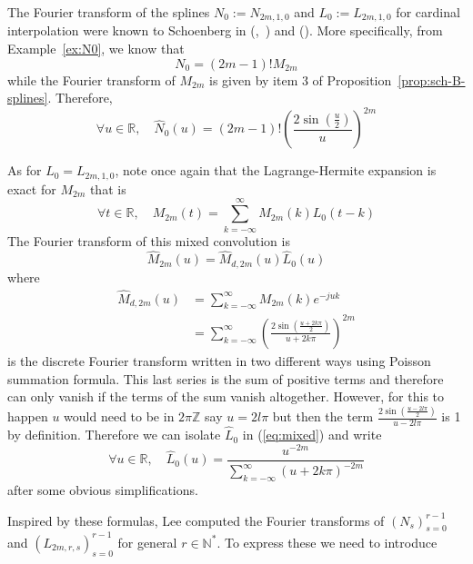 \begin{example} The Fourier transform of the splines $N_0 := N_{2m, 1, 0}$ and $L_0 := L_{2m,1,0}$ for cardinal 
  interpolation were known to Schoenberg in (\cite[Lecture 2, (1.8)]{Sch73},~\cite[(1.3)]{SS73}) and (\cite[Lecture 10, 
  (1.11)]{Sch73}). More specifically, from Example~\ref{ex:N0}, we know that \begin{equation*}
    N_0 = (2m-1)!M_{2m}
  \end{equation*}
  while the Fourier transform of $M_{2m}$ is given by item 3 of Proposition~\ref{prop:sch-B-splines}. Therefore, 
  \begin{equation}
    \forall u \in \mathbb{R}, \quad \hat{N}_0(u) = (2m-1)! {\left(\frac{2\sin(\frac{u}{2})}{u}\right)}^{2m}
  \end{equation}

  As for $L_0 = L_{2m,1,0}$, note once again that the Lagrange-Hermite expansion is exact for $M_{2m}$ that is 
  \begin{equation*}
    \forall t \in \mathbb{R}, \quad M_{2m}(t) = \sum_{k=-\infty}^{\infty} M_{2m}(k) L_0(t-k)
  \end{equation*}
  The Fourier transform of this mixed convolution is \begin{equation}\label{eq:mixed}
    \hat{M}_{2m}(u) = \hat{M}_{d,2m}(u) \hat{L}_0(u)
  \end{equation}
  where \begin{align*} \hat{M}_{d, 2m}(u) &= \sum_{k=-\infty}^{\infty} M_{2m}(k) e^{-juk} \\
    &= \sum_{k=-\infty}^{\infty} {\left(\frac{2 \sin(\frac{u+2k\pi}{2})}{u+2k\pi}\right)}^{2m}
  \end{align*}
  is the discrete Fourier transform written in two different ways using Poisson summation formula. This last series is 
  the sum of positive terms and therefore can only vanish if the terms of the sum vanish altogether. However, for this 
  to happen $u$ would need to be in $2\pi\mathbb{Z}$ say $u = 2l\pi$ but then the term $\frac{2 
  \sin(\frac{u-2l\pi}{2})}{u-2l\pi}$ is 1 by definition. Therefore we can isolate $\hat{L}_0$ in (\ref{eq:mixed}) and 
  write
  \begin{equation}
    \forall u \in \mathbb{R}, \quad \hat{L}_0(u) = \frac{u^{-2m}}{\displaystyle\sum_{k=-\infty}^{\infty} 
    {(u+2k\pi)}^{-2m}}
  \end{equation}
  after some obvious simplifications.
\end{example}

Inspired by these formulas, Lee computed the Fourier transforms of ${(N_s)}_{s=0}^{r-1}$ and 
${(L_{2m,r,s})}_{s=0}^{r-1}$ for general $r \in \mathbb{N}^*$. To express these we need to introduce

